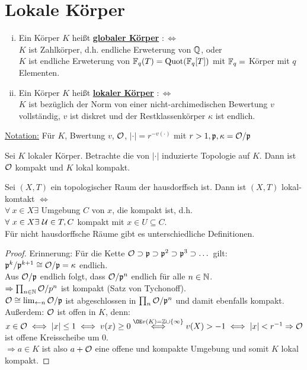 \section{Lokale Körper}
\begin{defi}
\begin{enumerate}[i)]
\item Ein Körper $K$ heißt \textbf{\underline{globaler Körper}} $:\iff$\\
$K$ ist Zahlkörper, d.h. endliche Erweterung von $\mathbb{Q}$, oder\\
$K$ ist endliche Erweterung von $\mathbb{F}_q(T)=\operatorname{Quot}(\mathbb{F}_q[T])$ mit $\mathbb{F}_q=$ Körper mit $q$ Elementen.
\item Ein Körper $K$ heißt \textbf{\underline{lokaler Körper}} $: \iff$\\
$K$ ist bezüglich der Norm von einer nicht-archimedischen Bewertung $v$ vollständig, $v$ ist diskret und der Restklassenkörper $\kappa$ ist endlich.
\end{enumerate}
\underline{Notation:} Für $K$, Bwertung $v$, $\mathcal{O}$, $|\cdot|=r^{-v(\cdot)}$ mit $r >1, \mathfrak{p}, \kappa=\mathcal{O}/\mathfrak{p}$
\end{defi}

\begin{Prop}
Sei $K$ lokaler Körper. Betrachte die von $|\cdot|$ induzierte Topologie auf $K$. Dann ist $\mathcal{O}$ kompakt und $K$ lokal kompakt.
\end{Prop}

\begin{Err}
Sei $(X,T)$ ein topologischer Raum der hausdorffsch ist. Dann ist $(X,T)$ lokal-komtakt $\iff$\\
$\forall \ x \in X \exists$ Umgebung $C$ von $x$, die kompakt ist, d.h.\\
$\forall \ x \in X \exists \ \mathcal{U} \in T, C$ kompakt mit $x \in U \subseteq C$.\\
\danger Für nicht hausdorffsche Räume gibt es unterschiedliche Definitionen. %
\end{Err}

\begin{proof}
Erinnerung: Für die Kette $ \mathcal{O} \supset \mathfrak{p} \supset \mathfrak{p}^2 \supset \mathfrak{p}^3 \supset \dots$ gilt:\\
$\mathfrak{p}^k/\mathfrak{p}^{k+1} \cong \mathcal{O}/\mathfrak{p} = \kappa$ endlich.\\
Aus $\mathcal{O}/\mathfrak{p}$ endlich folgt, dass $\mathcal{O}/\mathfrak{p}^n$ endlich für alle $n \in \mathbb{N}$.\\
$\Rightarrow \prod_{n \in \mathbb{N}} \mathcal{O}/p^n$ ist kompakt (Satz von Tychonoff).\\
$\mathcal{O} \cong \lim_{\leftarrow n} \mathcal{O}/\mathfrak{p}$ ist abgeschlossen in $\prod_n \mathcal{O}/\mathfrak{p}^n$ und damit ebenfalls kompakt.\\
Außerdem: $\mathcal{O}$ ist offen in $K$, denn:\\
$x \in \O \iff |x| \leq 1 \iff v(x) \geq 0 \stackrel{\OE v(K)=\Z\cup \{\infty\}}{\iff} v(X) >-1 \iff |x|<r^{-1} \Rightarrow \O$ ist offene Kreisscheibe um 0.\\
$\Rightarrow a \in K$ ist also $a+\mathcal{O}$ eine offene und kompakte Umgebung und somit $K$ lokal kompakt.
\end{proof}